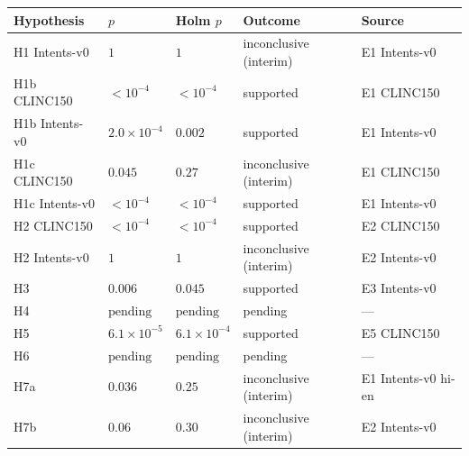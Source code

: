 \begin{tabular}{lllll}
\toprule
Hypothesis & $p$ & Holm $p$ & Outcome & Source \\
\midrule
H1 Intents-v0 & $1$ & $1$ & inconclusive (interim) & E1 Intents-v0 \\
H1b CLINC150 & $<10^{-4}$ & $<10^{-4}$ & supported & E1 CLINC150 \\
H1b Intents-v0 & $2.0\times 10^{-4}$ & $0.002$ & supported & E1 Intents-v0 \\
H1c CLINC150 & $0.045$ & $0.27$ & inconclusive (interim) & E1 CLINC150 \\
H1c Intents-v0 & $<10^{-4}$ & $<10^{-4}$ & supported & E1 Intents-v0 \\
H2 CLINC150 & $<10^{-4}$ & $<10^{-4}$ & supported & E2 CLINC150 \\
H2 Intents-v0 & $1$ & $1$ & inconclusive (interim) & E2 Intents-v0 \\
H3 & $0.006$ & $0.045$ & supported & E3 Intents-v0 \\
H4 & $\text{pending}$ & $\text{pending}$ & pending & --- \\
H5 & $6.1\times 10^{-5}$ & $6.1\times 10^{-4}$ & supported & E5 CLINC150 \\
H6 & $\text{pending}$ & $\text{pending}$ & pending & --- \\
H7a & $0.036$ & $0.25$ & inconclusive (interim) & E1 Intents-v0 hi-en \\
H7b & $0.06$ & $0.30$ & inconclusive (interim) & E2 Intents-v0 \\
\bottomrule
\end{tabular}
